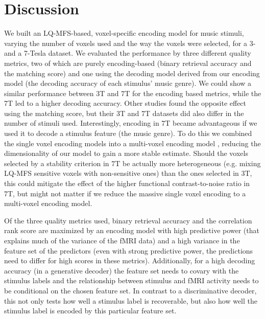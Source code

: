 
\section*{Discussion}

We built an LQ-MFS-based, voxel-specific encoding model
for music stimuli, varying the number of voxels used and the way the voxels were
selected, for a 3- and a 7-Tesla dataset. We evaluated the performance by three
different quality metrics, two of which are purely encoding-based (binary
retrieval accuracy and the matching score) and one using the decoding model
derived from our encoding model (the decoding accuracy of each stimulus' music genre). We could show a similar
performance between 3T and 7T for the encoding based metrics, while the 7T led
to a higher decoding accuracy. Other studies \citep[e.g.,][]{SF14} found the opposite
effect using the matching score, but their 3T and 7T datasets did also differ
in the number of stimuli used. Interestingly, encoding in 7T became
advantageous if we used it to decode a stimulus feature (the music genre). To
do this we combined the single voxel encoding models into a multi-voxel encoding
model \citep[see][]{NG09}, reducing the dimensionality of our model to gain a
more stable estimate. Should the voxels selected by a stability criterion in 7T
be actually more heterogeneous (e.g. mixing LQ-MFS sensitive voxels with
non-sensitive ones) than the ones selected in 3T, this could mitigate the
effect of the higher functional contrast-to-noise ratio in 7T, but might not
matter if we reduce the massive single voxel encoding to a multi-voxel encoding
model.

Of the three quality metrics used, binary retrieval accuracy and the
correlation rank score are maximized by an encoding model with high predictive
power (that explains much of the variance of the f{MRI} data) and a high
variance in the feature set of the predictors (even with strong predictive
power, the predictions need to differ for high scores in these metrics).
Additionally, for a high decoding accuracy (in a generative decoder) the
feature set needs to covary with the stimulus labels and the relationship
between stimulus and f{MRI} activity needs to be conditional on the chosen
feature set. In contrast to a discriminative decoder, this not only tests how
well a stimulus label is recoverable, but also how well the stimulus label is
encoded by this particular feature set.


